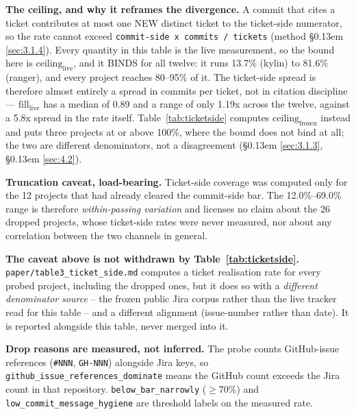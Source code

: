 \documentclass[conference]{IEEEtran}
\begin{document}
\begin{landscape}
\textbf{The ceiling, and why it reframes the divergence.} A commit that cites a ticket contributes at most one NEW distinct ticket to the ticket-side numerator, so the rate cannot exceed \texttt{commit-\allowbreak{}side x commits /\allowbreak{} tickets} (method \S\kern0.13em \ref{sec:3.1.4}). Every quantity in this table is the live measurement, so the bound here is $\mathrm{ceiling}_\mathrm{live}$, and it BINDS for all twelve: it runs 13.7\% (kylin) to 81.6\% (ranger), and every project reaches 80--95\% of it. The ticket-side spread is therefore almost entirely a spread in commits per ticket, not in citation discipline --- $\mathrm{fill}_\mathrm{live}$ has a median of 0.89 and a range of only 1.19x across the twelve, against a 5.8x spread in the rate itself. Table~\ref{tab:ticketside} computes $\mathrm{ceiling}_\mathrm{frozen}$ instead and puts three projects at or above 100\%, where the bound does not bind at all; the two are different denominators, not a disagreement (\S\kern0.13em \ref{sec:3.1.3}, \S\kern0.13em \ref{sec:4.2}).



\textbf{Truncation caveat, load-bearing.} Ticket-side coverage was computed only for the 12 projects that had already cleared the commit-side bar. The 12.0\%--69.0\% range is therefore \emph{within-passing variation} and licenses no claim about the 26 dropped projects, whose ticket-side rates were never measured, nor about any correlation between the two channels in general.



\textbf{The caveat above is not withdrawn by Table~\ref{tab:ticketside}.} \texttt{paper/\allowbreak{}table3\_\allowbreak{}ticket\_\allowbreak{}side.\allowbreak{}md} computes a ticket realisation rate for every probed project, including the dropped ones, but it does so with a \emph{different denominator source} -- the frozen public Jira corpus rather than the live tracker read for this table -- and a different alignment (issue-number rather than date). It is reported alongside this table, never merged into it.



\textbf{Drop reasons are measured, not inferred.} The probe counts GitHub-issue references (\texttt{\#NNN}, \texttt{GH-\allowbreak{}NNN}) alongside Jira keys, so \texttt{github\_\allowbreak{}issue\_\allowbreak{}references\_\allowbreak{}dominate} means the GitHub count exceeds the Jira count in that repository. \texttt{below\_\allowbreak{}bar\_\allowbreak{}narrowly} ($\geq$70\%) and \texttt{low\_\allowbreak{}commit\_\allowbreak{}message\_\allowbreak{}hygiene} are threshold labels on the measured rate.




\end{landscape}
\end{document}
